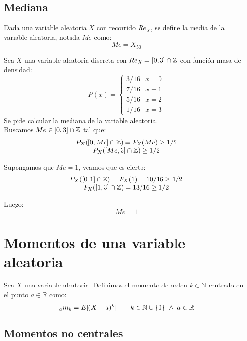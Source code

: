 \subsection{Mediana}
\begin{definicion}
    Dada una variable aleatoria $X$ con recorrido $Re_X$, se define la media de la variable aleatoria, notada $Me$ como:
    $$Me = X_{50}$$
\end{definicion}

\begin{ejemplo}
    Sea $X$ una variable aleatoria discreta con $Re_X = [0,3] \cap \mathbb Z$ con función masa de densidad:
    $$P(x) = \left\{ \begin{array}{cc}
        3/16 & x = 0 \\
        7/16 & x = 1 \\
        5/16 & x = 2 \\
        1/16 & x = 3
      \end{array} \right.$$
    Se pide calcular la mediana de la variable aleatoria.\\
    
    
    Buscamos $Me \in [0,3] \cap \mathbb Z$ tal que:
    $$\begin{array}{c}
        P_X([0, Me] \cap \mathbb Z) = F_X(Me) \geq 1/2 \\
        P_X([Me, 3] \cap \mathbb Z) \geq 1/2
      \end{array}$$
    
    
    Supongamos que $Me=1$, veamos que es cierto:
    $$\begin{array}{c}
        P_X([0, 1] \cap \mathbb Z) = F_X(1) = 10/16 \geq 1/2 \\
        P_X([1, 3] \cap \mathbb Z) = 13/16 \geq 1/2
      \end{array}$$
    
    Luego:
    $$Me = 1$$
\end{ejemplo}


\section{Momentos de una variable aleatoria}

Sea $X$ una variable aleatoria. Definimos el momento de orden $k\in \mathbb{N}$ centrado en el punto $a\in \mathbb{R}$ como:
\begin{equation*}
    _a m_k = E[(X-a)^k] \qquad k \in \mathbb N \cup \{0\} \ \land \ a \in \mathbb R
\end{equation*}

\subsection{Momentos no centrales}

